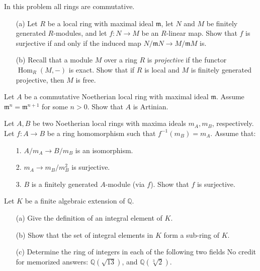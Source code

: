 \begin{prob}[F2017-Q3]
    In this problem all rings are commutative.
    \begin{itemize}
        \item[(a)] Let \(R\) be a local ring with maximal ideal \(\mathfrak{m}\), let \(N\) and \(M\) be finitely generated \(R\)-modules, and let \(f\colon N\to M\) be an \(R\)-linear map. Show that \(f\) is surjective if and only if the induced map \(N/\mathfrak{m}N\to M/\mathfrak{m}M\) is.
        \item[(b)] Recall that a module \(M\) over a ring \(R\) is \textit{projective} if the functor \(\operatorname{Hom}_{R}(M,-)\) is exact. Show that if \(R\) is local and \(M\) is finitely generated projective, then \(M\) is free.
    \end{itemize}
\end{prob}

\begin{prob}[F2010-Q4]
    Let \(A\) be a commutative Noetherian local ring with maximal ideal \(\mathfrak{m}\). Assume \(\mathfrak{m}^n = \mathfrak{m}^{n+1}\) for some \(n > 0\). Show that \(A\) is Artinian.
\end{prob}

\begin{prob}[F2009-Q5]
    Let \(A, B\) be two Noetherian local rings with maxima ideals \(m_A, m_B\), respectively. Let \(f : A \to B\) be a ring homomorphism such that \(f^{-1}(m_B) = m_A\). Assume that:
    \begin{itemize}
        \item[1.] \(A/m_A \to B/m_B\) is an isomorphism.
        \item[2.] \(m_A \to m_B/m_B^2\) is surjective.
        \item[3.] \(B\) is a finitely generated \(A\)-module (via \(f\)). Show that \(f\) is surjective.
    \end{itemize}
\end{prob}


\begin{prob}[F2015-Q6]
    Let \(K\) be a finite algebraic extension of \(\mathbb{Q}\).
    \begin{itemize}
        \item[(a)] Give the definition of an integral element of \(K\).
        \item[(b)] Show that the set of integral elements in \(K\) form a sub-ring of \(K\).
        \item[(c)] Determine the ring of integers in each of the following two fields No credit for memorized answers: \(\mathbb{Q}(\sqrt{13})\), and \(\mathbb{Q}(\sqrt[3]{2})\).
    \end{itemize}
\end{prob}

